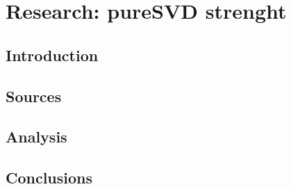 \chapter{Research: pureSVD strenght}
\label{chapter:<research_puresvd_strenght>}


\section{Introduction}
\label{sec:research_introduction}

\section{Sources}
\label{sec:research_sources}

\section{Analysis}
\label{sec:research_analysis}

\section{Conclusions}
\label{sec:research_conclusions}


\acresetall